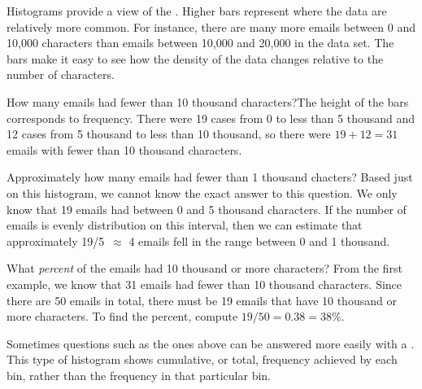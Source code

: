 Histograms provide a view of the . Higher bars represent where the data are relatively more common. For instance, there are many more emails between 0 and 10,000 characters than emails between 10,000 and 20,000 in the data set. The bars make it easy to see how the density of the data changes relative to the number of characters.

\begin{example}{How many emails had fewer than 10 thousand characters?}The height of the bars corresponds to frequency. There were 19 cases from 0 to less than 5 thousand and 12 cases from 5 thousand to less than 10 thousand, so there were $19+12=31$ emails with fewer than 10 thousand characters.
\end{example}

\begin{example}{Approximately how many emails had fewer than 1 thousand chacters?} Based just on this histogram, we cannot know the exact answer to this question. We only know that 19 emails had between 0 and 5 thousand characters. If the number of emails is evenly distribution on this interval, then we can estimate that approximately 19/5~$\approx$ 4 emails fell in the range between 0 and 1 thousand.
\end{example}

\begin{example}{What \emph{percent} of the emails had 10 thousand or more characters?}
From the first example, we know that 31 emails had fewer than 10 thousand characters. Since there are 50 emails in total, there must be 19 emails that have 10 thousand or more characters. To find the percent, compute $19/50 = 0.38 = 38\%$.
\end{example}

Sometimes questions such as the ones above can be answered more easily with a . This type of histogram shows cumulative, or total, frequency achieved by each bin, rather than the frequency in that particular bin.

